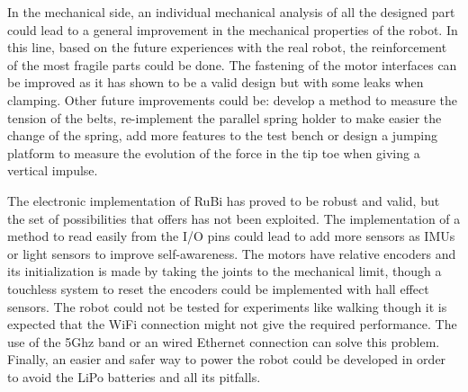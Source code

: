 In the mechanical side, an individual mechanical analysis of all the designed part could lead to a general improvement in the mechanical properties of the robot.
In this line, based on the future experiences with the real robot, the reinforcement of the most fragile parts could be done. 
The fastening of the motor interfaces can be improved as it has shown to be a valid design but with some leaks when clamping.
Other future improvements could be: develop a method to measure the tension of the belts, re-implement the parallel spring holder to make easier the change of the spring, add more features to the test bench or design a jumping platform to measure the evolution of the force in the tip toe when giving a vertical impulse.

The electronic implementation of RuBi has proved to be robust and valid, but the set of possibilities that offers has not been exploited.
The implementation of a method to read easily from the I/O pins could lead to add more sensors as IMUs or light sensors to improve self-awareness.
The motors have relative encoders and its initialization is made by taking the joints to the mechanical limit, though a touchless system to reset the encoders could be implemented with hall effect sensors.
The robot could not be tested for experiments like walking though it is expected that the WiFi connection might not give the required performance. 
The use of the 5Ghz band or an wired Ethernet connection can solve this problem.
Finally, an easier and safer way to power the robot could be developed in order to avoid the LiPo batteries and all its pitfalls.

